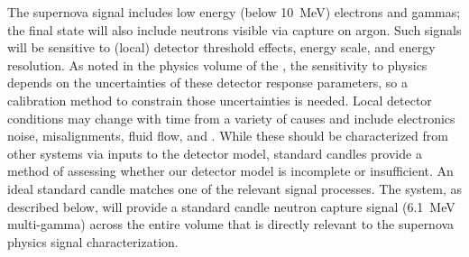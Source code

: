 

The supernova signal includes low energy (below \SI{10}{\MeV}) electrons and gammas; the final state will also include neutrons visible via capture on argon. Such signals will be sensitive to (local) detector threshold effects, energy scale, and energy resolution. 
As noted in the physics volume of the , 
the sensitivity to  physics 
depends on the uncertainties of these detector response parameters, so a calibration method to constrain those uncertainties is needed.
Local detector conditions may change with time from a variety of 
causes and include electronics noise, misalignments, fluid flow, and \efield. While these should be characterized from other systems via inputs to the detector model, standard candles provide a method of assessing whether our detector model is incomplete or insufficient. An ideal standard candle matches one of the relevant signal processes. The  system, as described below, will provide a standard candle neutron capture signal (\SI{6.1}{\MeV} multi-gamma) across the entire  volume that is directly relevant to the supernova physics signal characterization.



